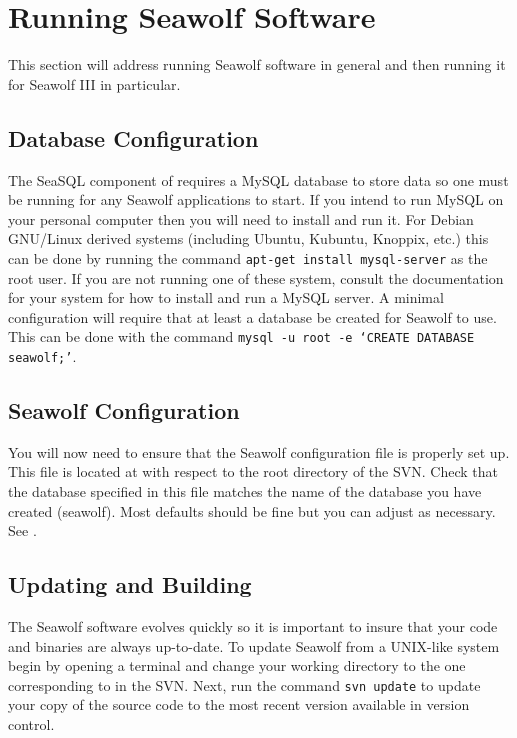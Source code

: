 
\newpage
\section{Running Seawolf Software} \label{running}
This section will address running Seawolf software in general and then running
it for Seawolf III in particular.

\subsection{Database Configuration} \label{runningmysql}
The SeaSQL component of \libseawolf{} requires a MySQL database to store data so
one must be running for any Seawolf applications to start. If you intend to run
MySQL on your personal computer then you will need to install and run it. For
Debian GNU/Linux derived systems (including Ubuntu, Kubuntu, Knoppix, etc.) this
can be done by running the command \texttt{apt-get install mysql-server} as the
root user. If you are not running one of these system, consult the documentation
for your system for how to install and run a MySQL server. A minimal
configuration will require that at least a database be created for Seawolf to
use. This can be done with the command \texttt{mysql -u root -e `CREATE
  DATABASE seawolf;'}. 

\subsection{Seawolf Configuration} \label{runningconfig}
You will now need to ensure that the Seawolf configuration file is properly set
up. This file is located at  with respect to
the root directory of the SVN. Check that the database specified in this file
matches the name of the database you have created (seawolf). Most defaults
should be fine but you can adjust as necessary. See
.

\subsection{Updating and Building} \label{runningupate}
The Seawolf software evolves quickly so it is important to insure that your code
and binaries are always up-to-date. To update Seawolf from a UNIX-like system
begin by opening a terminal and change your working directory to the one
corresponding to  in the SVN. Next, run the command \texttt{svn
  update} to update your copy of the source code to the most recent version
available in version control. 

